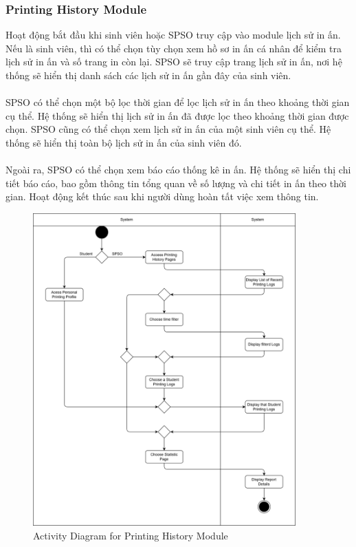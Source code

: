 \newpage
\subsubsection{Printing History Module}
Hoạt động bắt đầu khi sinh viên hoặc SPSO truy cập vào module lịch sử in ấn. Nếu là sinh viên, thì có thể chọn tùy chọn xem hồ sơ in ấn cá nhân để kiểm tra lịch sử in ấn và số trang in còn lại. SPSO sẽ truy cập trang lịch sử in ấn, nơi hệ thống sẽ hiển thị danh sách các lịch sử in ấn gần đây của sinh viên.
\\ \\
SPSO có thể chọn một bộ lọc thời gian để lọc lịch sử in ấn theo khoảng thời gian cụ thể. Hệ thống sẽ hiển thị lịch sử in ấn đã được lọc theo khoảng thời gian được chọn. SPSO cũng có thể chọn xem lịch sử in ấn của một sinh viên cụ thể. Hệ thống sẽ hiển thị toàn bộ lịch sử in ấn của sinh viên đó.
\\ \\
Ngoài ra, SPSO có thể chọn xem báo cáo thống kê in ấn. Hệ thống sẽ hiển thị chi tiết báo cáo, bao gồm thông tin tổng quan về số lượng và chi tiết in ấn theo thời gian. Hoạt động kết thúc sau khi người dùng hoàn tất việc xem thông tin.
\begin{figure}[htbp]
    \centering
    \includegraphics[width=0.9\textwidth]{Images/Activity/Printing_history_activity.png}
    \caption{Activity Diagram for Printing History Module}
\end{figure}

